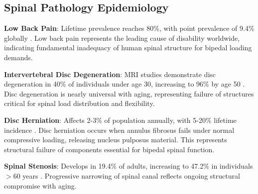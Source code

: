 \subsection{Spinal Pathology Epidemiology}

\textbf{Low Back Pain}: Lifetime prevalence reaches 80\%, with point prevalence of 9.4\% globally \citep{hoy2012global}. Low back pain represents the leading cause of disability worldwide, indicating fundamental inadequacy of human spinal structure for bipedal loading demands.

\textbf{Intervertebral Disc Degeneration}: MRI studies demonstrate disc degeneration in 40\% of individuals under age 30, increasing to 96\% by age 50 \citep{brinjikji2015systematic}. Disc degeneration is nearly universal with aging, representing failure of structures critical for spinal load distribution and flexibility.

\textbf{Disc Herniation}: Affects 2-3\% of population annually, with 5-20\% lifetime incidence \citep{jordan2009herniated}. Disc herniation occurs when annulus fibrosus fails under normal compressive loading, releasing nucleus pulposus material. This represents structural failure of components essential for bipedal spinal function.

\textbf{Spinal Stenosis}: Develops in 19.4\% of adults, increasing to 47.2\% in individuals $>$60 years \citep{kalichman2009spinal}. Progressive narrowing of spinal canal reflects ongoing structural compromise with aging.

